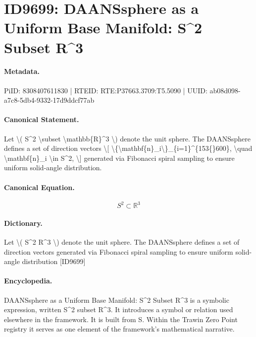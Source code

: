 \section*{ID9699: DAANSsphere as a Uniform Base Manifold: S\textasciicircum{}2 Subset R\textasciicircum{}3}
\paragraph{Metadata.}
PiID: 8308407611830 | RTEID: RTE:P37663.3709:T5.5090 | UUID: ab08d098-a7c8-5db4-9332-17d9ddcf77ab

\paragraph{Canonical Statement.}
Let \textbackslash{}( S\textasciicircum{}2 \textbackslash{}subset \textbackslash{}mathbb\{R\}\textasciicircum{}3 \textbackslash{}) denote the unit sphere. The DAANSsphere defines a set of direction vectors \textbackslash{}[ \textbackslash{}\{\textbackslash{}mathbf\{n\}\_i\textbackslash{}\}\_\{i=1\}\textasciicircum{}\{153\{\}600\}, \textbackslash{}quad \textbackslash{}mathbf\{n\}\_i \textbackslash{}in S\textasciicircum{}2, \textbackslash{}] generated via Fibonacci spiral sampling to ensure uniform solid-angle distribution.

\paragraph{Canonical Equation.}
\[
S^2 \subset \mathbb{R}^3
\]

\paragraph{Dictionary.}
Let \textbackslash{}( S\textasciicircum{}2 R\textasciicircum{}3 \textbackslash{}) denote the unit sphere. The DAANSsphere defines a set of direction vectors generated via Fibonacci spiral sampling to ensure uniform solid-angle distribution [ID9699]

\paragraph{Encyclopedia.}
DAANSsphere as a Uniform Base Manifold: S\textasciicircum{}2 Subset R\textasciicircum{}3 is a symbolic expression, written S\textasciicircum{}2 subset R\textasciicircum{}3. It introduces a symbol or relation used elsewhere in the framework. It is built from S. Within the Trawin Zero Point registry it serves as one element of the framework's mathematical narrative.
